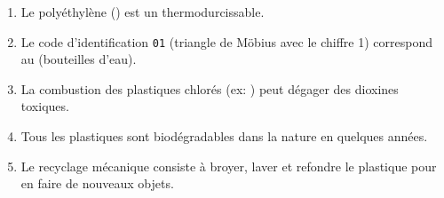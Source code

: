 \documentclass[11pt]{article}
\begin{document}
\begin{exercice}
\begin{enumerate}
    \item Le polyéthylène () est un thermodurcissable.
    \item Le code d'identification \texttt{01} (triangle de Möbius avec le chiffre 1) correspond au  (bouteilles d'eau).
    \item La combustion des plastiques chlorés (ex: ) peut dégager des dioxines toxiques.
    \item Tous les plastiques sont biodégradables dans la nature en quelques années.
    \item Le recyclage mécanique consiste à broyer, laver et refondre le plastique pour en faire de nouveaux objets.
\end{enumerate}
\end{exercice}
\end{document}
